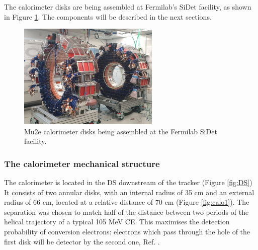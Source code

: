 The calorimeter disks are being assembled at Fermilab's SiDet facility, as shown in Figure 
\ref{fig:calostatus}. The components will be described in the next sections.

\begin{figure}[!h]
    \centering
    \includegraphics[width =0.6\textwidth]{figures/png/Screenshot_20240706_151533.png}
    \caption[The Mu2e calorimeter disks.]{Mu2e calorimeter disks being assembled at the Fermilab SiDet facility.}
    \label{fig:calostatus}
\end{figure}

\subsubsection{The calorimeter mechanical structure}
The calorimeter is located in the DS downstream of the tracker (Figure \ref{fig:DS})
It consists of two annular disks, with an internal radius of 35 cm and 
an external radius of 66 cm, located at a relative distance of 70 cm (Figure \ref{fig:calo1}).
The separation was chosen to match half of the distance between two periods of the helical trajectory 
of a typical 105 MeV CE. This maximises the detection probability of conversion 
electrons: electrons which pass through the hole of the first disk will be detector by the second one, Ref. \cite{em7}. 


